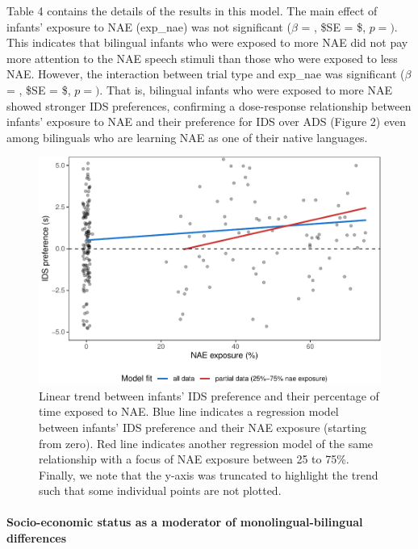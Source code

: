 \documentclass[,man,floatsintext]{apa6}
\let\oldparagraph\paragraph
\renewcommand{\paragraph}[1]{\oldparagraph{#1}\mbox{}}
\begin{document}
Table 4 contains the details of the results in this model. The main effect of infants' exposure to NAE (exp\_nae) was not significant (\(\beta\) = , \$SE = \$, \(p = )\). This indicates that bilingual infants who were exposed to more NAE did not pay more attention to the NAE speech stimuli than those who were exposed to less NAE. However, the interaction between trial type and exp\_nae was significant (\(\beta\) = , \$SE = \$, \(p = )\). That is, bilingual infants who were exposed to more NAE showed stronger IDS preferences, confirming a dose-response relationship between infants' exposure to NAE and their preference for IDS over ADS (Figure 2) even among bilinguals who are learning NAE as one of their native languages.

\begin{figure}
\centering
\includegraphics{mb1b-paper_files/figure-latex/fig2-1.pdf}
\caption{\label{fig:fig2}Linear trend between infants' IDS preference and their percentage of time exposed to NAE. Blue line indicates a regression model between infants' IDS preference and their NAE exposure (starting from zero). Red line indicates another regression model of the same relationship with a focus of NAE exposure between 25 to 75\%. Finally, we note that the y-axis was truncated to highlight the trend such that some individual points are not plotted.}
\end{figure}

\hypertarget{socio-economic-status-as-a-moderator-of-monolingual-bilingual-differences}{%
\paragraph{Socio-economic status as a moderator of monolingual-bilingual differences}\label{socio-economic-status-as-a-moderator-of-monolingual-bilingual-differences}}
\end{document}
